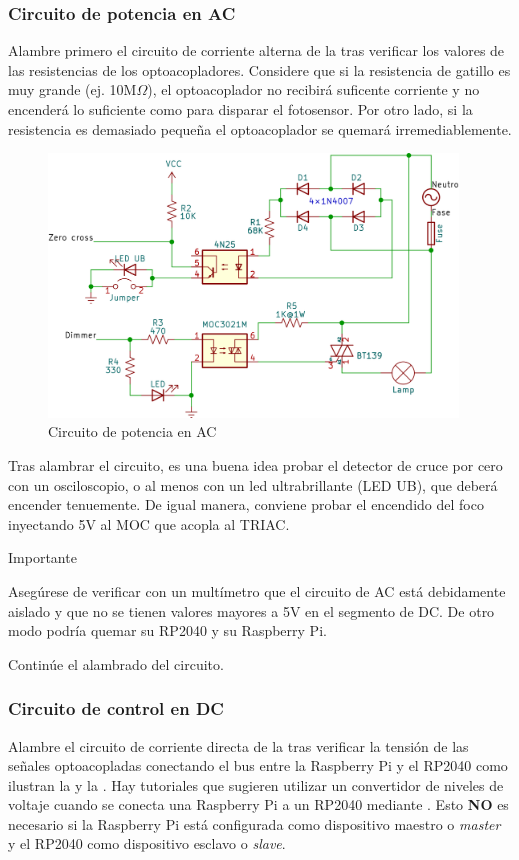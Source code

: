 \subsubsection{Circuito de potencia en AC}%
Alambre primero el circuito de corriente alterna de la  tras verificar los valores de las resistencias de los optoacopladores.
Considere que si la resistencia de gatillo es muy grande (ej. 10M$\Omega$), el optoacoplador no recibirá suficente corriente y no encenderá lo suficiente como para disparar el fotosensor.
Por otro lado, si la resistencia es demasiado pequeña el optoacoplador se quemará irremediablemente.

\begin{figure}[H]
	\centering
	\includegraphics[width=0.5\columnwidth,height=7cm,keepaspectratio]{img/circuit-ac.png}
	\caption{Circuito de potencia en AC}%
	\label{fig:circuit-ac}
\end{figure}

Tras alambrar el circuito, es una buena idea probar el detector de cruce por cero con un osciloscopio, o al menos con un led ultrabrillante (LED UB), que deberá encender tenuemente.
De igual manera, conviene probar el encendido del foco inyectando 5V al MOC que acopla al TRIAC.

\medskip
\begin{importantbox}{\large Importante}
	\begin{center}
		Asegúrese de verificar con un multímetro que el circuito de AC está debidamente aislado y que no se tienen valores mayores a 5V en el segmento de DC.
		De otro modo podría quemar su RP2040 y su Raspberry Pi.
	\end{center}
\end{importantbox}

Continúe el alambrado del circuito.

\subsubsection{Circuito de control en DC}%
Alambre el circuito de corriente directa de la  tras verificar la tensión de las señales optoacopladas conectando el bus \IIC entre la Raspberry Pi y el RP2040 como ilustran la  y la .
Hay tutoriales que sugieren utilizar un convertidor de niveles de voltaje cuando se conecta una Raspberry Pi a un RP2040 mediante \IIC.
Esto \textbf{NO} es necesario si la Raspberry Pi está configurada como dispositivo maestro o \emph{master} y el RP2040 como dispositivo esclavo o \emph{slave}.

